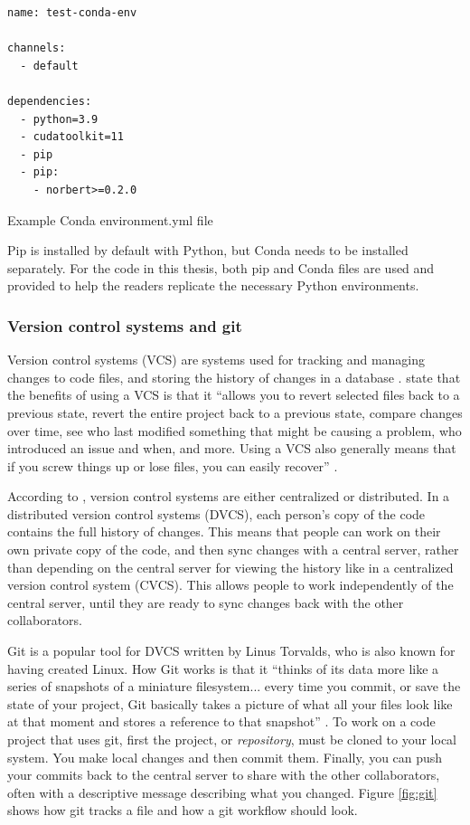 \documentclass[report.tex]{subfiles}
\begin{document}
\begin{listing}[ht]
\centering
\begin{BVerbatim}
name: test-conda-env

channels:
  - default

dependencies:
  - python=3.9
  - cudatoolkit=11
  - pip
  - pip:
    - norbert>=0.2.0
\end{BVerbatim}
	\caption{Example Conda environment.yml file}
	\label{lst:condayml}
\end{listing}

Pip is installed by default with Python, but Conda needs to be installed separately. For the code in this thesis, both pip and Conda files are used and provided to help the readers replicate the necessary Python environments.

\subsubsection{Version control systems and git}

Version control systems (VCS) are systems used for tracking and managing changes to code files, and storing the history of changes in a database \parencite{gitbook}. \citeauthor{gitbook} state that the benefits of using a VCS is that it ``allows you to revert selected files back to a previous state, revert the entire project back to a previous state, compare changes over time, see who last modified something that might be causing a problem, who introduced an issue and when, and more. Using a VCS also generally means that if you screw things up or lose files, you can easily recover'' \parencite[1]{gitbook}.

According to \textcite{gitbook}, version control systems are either centralized or distributed. In a distributed version control systems (DVCS), each person's copy of the code contains the full history of changes. This means that people can work on their own private copy of the code, and then sync changes with a central server, rather than depending on the central server for viewing the history like in a centralized version control system (CVCS). This allows people to work independently of the central server, until they are ready to sync changes back with the other collaborators.

Git is a popular tool for DVCS written by Linus Torvalds, who is also known for having created Linux. How Git works is that it ``thinks of its data more like a series of snapshots of a miniature filesystem... every time you commit, or save the state of your project, Git basically takes a picture of what all your files look like at that moment and stores a reference to that snapshot'' \parencite[6]{gitbook}. To work on a code project that uses git, first the project, or \textit{repository}, must be cloned to your local system. You make local changes and then commit them. Finally, you can push your commits back to the central server to share with the other collaborators, often with a descriptive message describing what you changed. Figure \ref{fig:git} shows how git tracks a file and how a git workflow should look.
\end{document}
